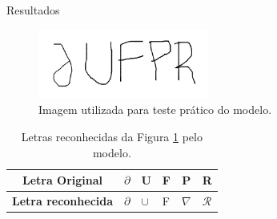 \documentclass{beamer}
\begin{document}
    \begin{frame}{Resultados}
        \begin{figure}[hbt]
            \centering
            \includegraphics[width=0.5\textwidth]{TesteUFPR.png}
            \caption{Imagem utilizada para teste prático do modelo.}
            \label{fig:parufpr}
        \end{figure}

         \begin{table}[htb]
            \centering
            \caption{Letras reconhecidas da Figura \ref{fig:parufpr} pelo modelo.}
            \label{tab:parufpr}
            \begin{tabular}{@{}clllll@{}}
                \toprule
                \textbf{Letra Original}    & \multicolumn{1}{c}{$\partial$} & \multicolumn{1}{c}{U} &     \multicolumn{1}{c}{F} & \multicolumn{1}{c}{P} & \multicolumn{1}{c}{R} \\ \midrule
                \textbf{Letra reconhecida} & $\partial$                     & $\cup$                & F                     & $\nabla$              & $\mathcal{R}$         \\ \bottomrule
            \end{tabular}
        \end{table}
    \end{frame}
\end{document}
